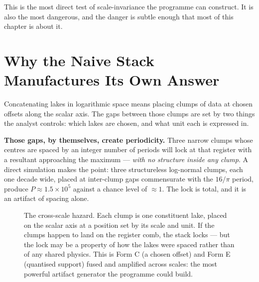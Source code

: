 \documentclass[11pt, letterpaper, openany]{book}
\begin{document}
This is the most direct test of scale-invariance the programme can construct. It is also the most
dangerous, and the danger is subtle enough that most of this chapter is about it.

\section{Why the Naive Stack Manufactures Its Own Answer}

Concatenating lakes in logarithmic space means placing clumps of data at chosen offsets along the
scalar axis. The gaps between those clumps are set by two things the analyst controls: which lakes
are chosen, and what unit each is expressed in.

\begin{formbox}
\textbf{Those gaps, by themselves, create periodicity.} Three narrow clumps whose centres are
spaced by an integer number of periods will lock at that register with a resultant approaching the
maximum --- \emph{with no structure inside any clump}. A direct simulation makes the point: three
structureless log-normal clumps, each one decade wide, placed at inter-clump gaps commensurate with
the $16/\pi$ period, produce $P \approx 1.5\times10^5$ against a chance level of $\approx 1$. The
lock is total, and it is an artifact of spacing alone.
\end{formbox}

\begin{figure}[H]
\centering
{}
\caption{The cross-scale hazard. Each clump is one constituent lake, placed on the scalar axis at a
position set by its scale and unit. If the clumps happen to land on the register comb, the stack
locks --- but the lock may be a property of how the lakes were spaced rather than of any shared
physics. This is Form C (a chosen offset) and Form E (quantised support) fused and amplified across
scales: the most powerful artifact generator the programme could build.}
\end{figure}
\end{document}
